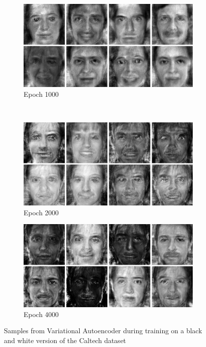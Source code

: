 \begin{figure}[h!]
    \begin{subfigure}[b]{0.45\textwidth}
         \includegraphics[width=\textwidth]{fig/vae/caltech_epoch1000}
        \caption{Epoch 1000}
    \end{subfigure}
    ~
    \begin{subfigure}[b]{0.45\textwidth}
         \includegraphics[width=\textwidth]{fig/vae/caltech_epoch2000}
        \caption{Epoch 2000}
    \end{subfigure}

    \begin{subfigure}[b]{\textwidth}
         \includegraphics[width=\textwidth]{fig/vae/caltech_epoch4000}
        \caption{Epoch 4000}
    \end{subfigure}
    \caption{Samples from Variational Autoencoder  during training on a black and white version of the Caltech dataset}
    \label{vaq-bwcaltech-samples}
\end{figure}


